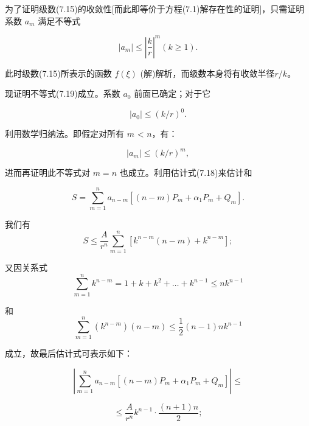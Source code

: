 为了证明级数(7.15)的收敛性[而此即等价于方程(7.1)解存在性的证明]，只需证明系数 $a_{m}$ 满足不等式

\begin{equation*}
\left| a_ {m} \right| \leqslant \left| \frac {k}{r} \right| ^ {m} (k \geqslant 1).\tag{7.19}
\end{equation*}

此时级数(7.15)所表示的函数 $f(\xi)$ (解)解析，而级数本身将有收敛半径$r$/$k$。

现证明不等式(7.19)成立。系数 $a_{0}$ 前面已确定；对于它

\begin{equation*}
\left| a _ {0} \right| \leqslant (k / r) ^ {0}.
\end{equation*}

利用数学归纳法。即假定对所有 $m$ < $n$，有：

\begin{equation*}
\left| a _ {m} \right| \leqslant (k / r) ^ {m},
\end{equation*}

进而再证明此不等式对 $m = n$ 也成立。利用估计式(7.18)来估计和

\begin{equation*}
S = \sum_ {m = 1} ^ {n} a _ {n - m} [ (n - m) P _ {m} + \alpha_ {1} P _ {m} + Q _ {m} ].
\end{equation*}

我们有
\begin{equation*}
S \leqslant \frac {A}{r ^ {n}} \sum_ {m = 1} ^ {n} [ k ^ {n - m} (n - m) + k ^ {n - m} ];
\end{equation*}

又因关系式
\begin{equation*}
\sum_ {m = 1} ^ {n} k ^ {n - m} = 1 + k + k ^ {2} + \dots + k ^ {n - 1} \leqslant n k ^ {n - 1}
\end{equation*}

和
\begin{equation*}
\sum_ {m = 1} ^ {n} \left(k ^ {n - m}\right) (n - m) \leqslant \frac {1}{2} (n - 1) n k ^ {n - 1}
\end{equation*}

成立，故最后估计式可表示如下：

\begin{equation*}
\left| \sum_ {m = 1} ^ {n} a _ {n - m} [ (n - m) P _ {m} + \alpha_ {1} P _ {m} + Q _ {m} ] \right| \leqslant
\end{equation*}

\begin{equation*}
\leqslant \frac {A}{r ^ {n}} k ^ {n - 1} \cdot \frac {(n + 1) n}{2};
\end{equation*}

